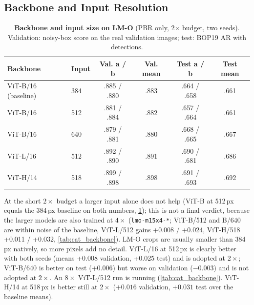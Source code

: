 \subsection{Backbone and Input Resolution}
\label{sec:acc:backbone}
\begin{table}[t]
  \centering
  \small
  \begin{tabular}{@{}llcccc@{}}
    \toprule
    Backbone & Input & Val. a / b & Val. mean & Test a / b & Test mean \\
    \midrule
    ViT-B/16 (baseline) & 384 & .885 / .880 & .883 & .664 / .658 & .661 \\
    ViT-B/16 & 512 & .881 / .884 & .882 & .657 / .664 & .661 \\
    ViT-B/16 & 640 & .879 / .881 & .880 & .668 / .665 & .667 \\
    ViT-L/16 & 512 & .892 / .890 & .891 & .690 / .681 & .686 \\
    ViT-H/14 & 518 & .899 / .898 & .898 & .691 / .693 & .692 \\
    \bottomrule
  \end{tabular}
  \caption{\textbf{Backbone and input size on LM-O} (PBR only, 2$\times$ budget, two seeds).
  Validation: noisy-box score on the real validation images; test: BOP19 AR with detections.}
  \label{tab:acc_backbone}
\end{table}
At the short $2\times$ budget a larger input alone does not help (ViT-B at 512\,px equals the
384\,px baseline on both numbers, \cref{tab:acc_backbone}); this is not a final verdict, because the
larger models are also trained at $4\times$ (\texttt{lmo-m15x4-*}; ViT-B/512 and B/640 are within noise of the baseline, ViT-L/512 gains +0.008 / +0.024, ViT-H/518 +0.011 / +0.032, \cref{tab:cat_backbone}). LM-O crops are usually smaller than 384\,px natively, so more pixels add
no detail. ViT-L/16 at 512\,px is clearly better with both seeds (means +0.008 validation, +0.025 test) and is
adopted at $2\times$; ViT-B/640 is better on test (+0.006) but worse on validation ($-$0.003) and is not
adopted at $2\times$. An $8\times$ ViT-L/512 run is
running (\cref{tab:cat_backbone}).
ViT-H/14 at 518\,px is better still at $2\times$ ($+0.016$ validation, $+0.031$ test over the baseline means).

